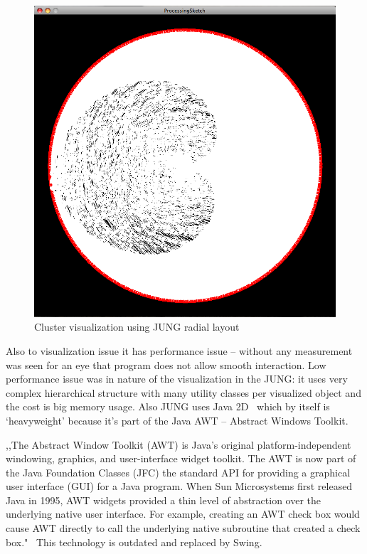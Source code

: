 \begin{figure}[h!]
\centering
\includegraphics[scale=0.4]{pictures/using_JUNG_radial.png}
\caption{Cluster visualization using JUNG radial layout}
\label{fig:JUNG_radial_layout}
\end{figure}


Also to visualization issue it has performance issue -- without any measurement was seen for an eye that program does not allow smooth interaction. Low performance issue was in nature of the visualization in the JUNG: it uses very complex hierarchical structure with many utility classes per visualized object and the cost is big memory usage. Also JUNG uses Java 2D~\cite{JAVA_2D} which by itself is `heavyweight' because it's part of the Java AWT -- Abstract Windows Toolkit.


,,The Abstract Window Toolkit (AWT) is Java's original platform-independent windowing, graphics, and user-interface widget toolkit. The AWT is now part of the Java Foundation Classes (JFC) the standard API for providing a graphical user interface (GUI) for a Java program. When Sun Microsystems first released Java in 1995, AWT widgets provided a thin level of abstraction over the underlying native user interface. For example, creating an AWT check box would cause AWT directly to call the underlying native subroutine that created a check box."~\cite{JAVA_AWT} This technology is outdated and replaced by Swing.


